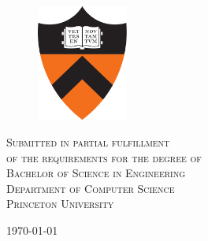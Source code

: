 \documentclass[11pt, notitlepage]{report}
\begin{document}
\begin{titlepage}
\vspace{2em}
\begin{figure}[H]
\centering
\includegraphics[width=30mm]{figs/princeton_shield}
\end{figure}

\vspace{4em}
 
\textsc{
Submitted in partial fulfillment\\
of the requirements for the degree of\\
Bachelor of Science in Engineering\\
Department of Computer Science\\
Princeton University
}\\[0.5cm]

\vspace{2em}

\textsc{\large \today}\\[5mm] %
\pagestyle{empty}



\end{titlepage}
\end{document}

